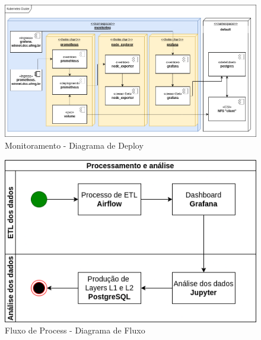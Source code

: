 \documentclass[10pt,brazil]{beamer}
\theoremstyle{definition}
\begin{document}
\begin{frame}[plain]
  \hspace*{-10mm}
  \begin{figure}
    \centering  
  \includegraphics[width=.85\paperwidth]{tcc_monitoring_deploy.png}
      \caption[Monitoramento deploy]{Monitoramento - Diagrama de Deploy}
  \end{figure}  
\end{frame}

\begin{frame}[plain]
  \hspace*{-10mm}
  \begin{figure}
    \centering  
  \includegraphics[width=.85\paperwidth]{fluxo_processo.png}
      \caption{Fluxo de Process - Diagrama de Fluxo}
  \end{figure}  
\end{frame}
\end{document}
